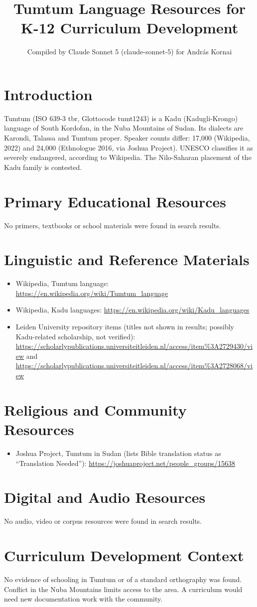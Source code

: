 \documentclass[12pt]{article}
\title{Tumtum Language Resources for K-12 Curriculum Development}
\author{Compiled by Claude Sonnet 5 (claude-sonnet-5) for Andr\'as Kornai}
\date{}
\begin{document}
\maketitle

\section{Introduction}
Tumtum (ISO 639-3 tbr, Glottocode tumt1243) is a Kadu (Kadugli-Krongo) language of South Kordofan, in the Nuba Mountains of Sudan. Its dialects are Karondi, Talassa and Tumtum proper. Speaker counts differ: 17,000 (Wikipedia, 2022) and 24,000 (Ethnologue 2016, via Joshua Project). UNESCO classifies it as severely endangered, according to Wikipedia. The Nilo-Saharan placement of the Kadu family is contested.

\section{Primary Educational Resources}
No primers, textbooks or school materials were found in search results.

\section{Linguistic and Reference Materials}
\begin{itemize}
\item Wikipedia, Tumtum language: \url{https://en.wikipedia.org/wiki/Tumtum_language}
\item Wikipedia, Kadu languages: \url{https://en.wikipedia.org/wiki/Kadu_languages}
\item Leiden University repository items (titles not shown in results; possibly Kadu-related scholarship, not verified): \url{https://scholarlypublications.universiteitleiden.nl/access/item%3A2729430/view} and \url{https://scholarlypublications.universiteitleiden.nl/access/item%3A2728068/view}
\end{itemize}

\section{Religious and Community Resources}
\begin{itemize}
\item Joshua Project, Tumtum in Sudan (lists Bible translation status as ``Translation Needed''): \url{https://joshuaproject.net/people_groups/15638}
\end{itemize}

\section{Digital and Audio Resources}
No audio, video or corpus resources were found in search results.

\section{Curriculum Development Context}
No evidence of schooling in Tumtum or of a standard orthography was found. Conflict in the Nuba Mountains limits access to the area. A curriculum would need new documentation work with the community.
\end{document}
